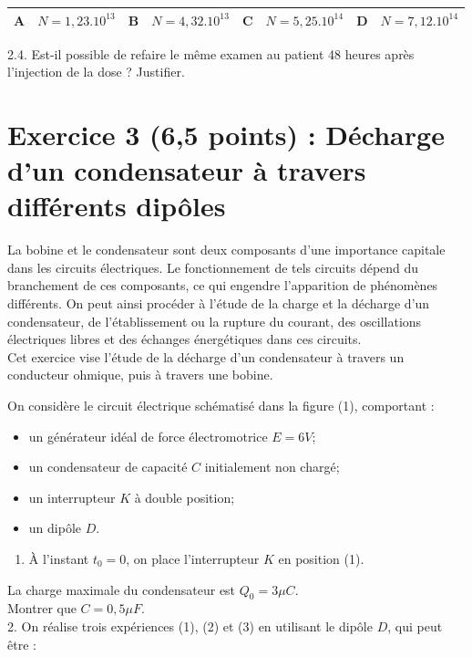 \begin{center}
\begin{tabular}{|l|l|l|l|l|l|l|l|}
\hline
$\mathbf{A}$ & $N=1,23.10^{13}$ & $\mathbf{B}$ & $N=4,32.10^{13}$ & $\mathbf{C}$ & $N=5,25.10^{14}$ & $\mathbf{D}$ & $N=7,12.10^{14}$ \\
\hline
\end{tabular}
\end{center}

2.4. Est-il possible de refaire le même examen au patient 48 heures après l'injection de la dose ? Justifier.


\section*{Exercice 3 (6,5 points) : Décharge d'un condensateur à travers différents dipôles}
La bobine et le condensateur sont deux composants d'une importance capitale dans les circuits électriques. Le fonctionnement de tels circuits dépend du branchement de ces composants, ce qui engendre l'apparition de phénomènes différents. On peut ainsi procéder à l'étude de la charge et la décharge d'un condensateur, de l'établissement ou la rupture du courant, des oscillations électriques libres et des échanges énergétiques dans ces circuits.\\
Cet exercice vise l'étude de la décharge d'un condensateur à travers un conducteur ohmique, puis à travers une bobine.

On considère le circuit électrique schématisé dans la figure (1), comportant :

\begin{itemize}
  \item un générateur idéal de force électromotrice $E=6 V$;
  \item un condensateur de capacité $C$ initialement non chargé;
  \item un interrupteur $K$ à double position;
  \item un dipôle $D$.
\end{itemize}

\begin{enumerate}
  \item À l'instant $t_{0}=0$, on place l'interrupteur $K$ en position (1).
\end{enumerate}

La charge maximale du condensateur est $Q_{0}=3 \mu C$.\\
Montrer que $C=0,5 \mu F$.\\
2. On réalise trois expériences (1), (2) et (3) en utilisant le dipôle $D$, qui peut être :

